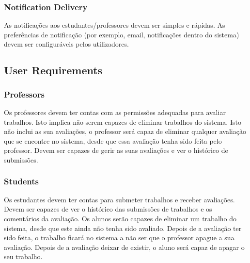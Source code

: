 \documentclass[10pt]{article}
\begin{document}
\subsubsection{Notification Delivery}
As notificações aos estudantes/professores devem ser simples e rápidas. 
As preferências de notificação (por exemplo, email, notificações dentro do sistema) devem ser configuráveis pelos utilizadores.

\newpage

\subsection{User Requirements}

\subsubsection{Professors}
Os professores devem ter contas com as permissões adequadas para avaliar trabalhos. Isto implica não serem capazes de eliminar
trabalhos do sistema. Isto não inclui as sua avaliações, o professor será capaz de eliminar qualquer avaliação que
se encontre no sistema, desde que essa avaliação tenha sido feita pelo professor.
Devem ser capazes de gerir as suas avaliações e ver o histórico de submissões.

\subsubsection{Students}
Os estudantes devem ter contas para submeter trabalhos e receber avaliações.
Devem ser capazes de ver o histórico das submissões de trabalhos e os comentários da avaliação.
Os alunos serão capazes de eliminar um trabalho do sistema, desde que este ainda não tenha sido avaliado.
Depois de a avaliação ter sido feita, o trabalho ficará no sistema a não ser que o professor apague a sua avaliação.
Depois de a avaliação deixar de existir, o aluno será capaz de apagar o seu trabalho.
\end{document}
